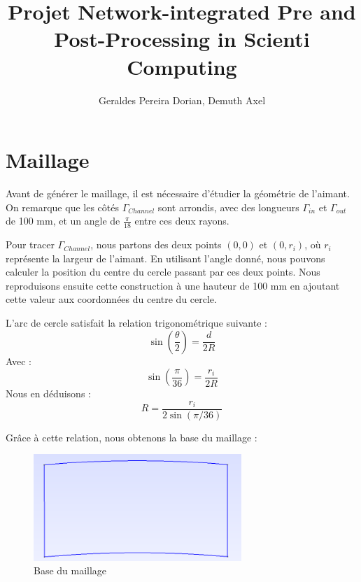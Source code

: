 \documentclass{article}
\title{Projet Network-integrated Pre and Post-Processing in Scienti Computing}
\author{Geraldes Pereira Dorian, Demuth Axel}
\begin{document}
\maketitle  
\section{Maillage}

Avant de générer le maillage, il est nécessaire d'étudier la géométrie de l'aimant. On remarque que les côtés  \textit{\( \Gamma_{Channel} \)} sont arrondis, avec des longueurs \textit{\( \Gamma_{in}\)} et \textit{\( \Gamma_{out}\)} de 100 mm, et un angle de \( \frac{\pi}{18} \) entre ces deux rayons.

Pour tracer \textit{\( \Gamma_{Channel} \)}, nous partons des deux points \((0,0)\) et \((0, r_i)\), où \( r_i \) représente la largeur de l'aimant. En utilisant l'angle donné, nous pouvons calculer la position du centre du cercle passant par ces deux points. Nous reproduisons ensuite cette construction à une hauteur de 100 mm en ajoutant cette valeur aux coordonnées du centre du cercle.

L’arc de cercle satisfait la relation trigonométrique suivante :
\begin{equation}
\sin\left(\frac{\theta}{2}\right) = \frac{d}{2R}
\end{equation}
Avec :
\begin{equation}
\sin\left(\frac{\pi}{36}\right) = \frac{r_i}{2R}
\end{equation}
Nous en déduisons :
\begin{equation}
R = \frac{r_i}{2 \sin(\pi/36)}
\end{equation}

Grâce à cette relation, nous obtenons la base du maillage :

\begin{figure}[H]
    \centering
    \includegraphics[width=0.7\textwidth]{images/gmsh_1.png}
    \caption{Base du maillage}
\end{figure}
\end{document}
